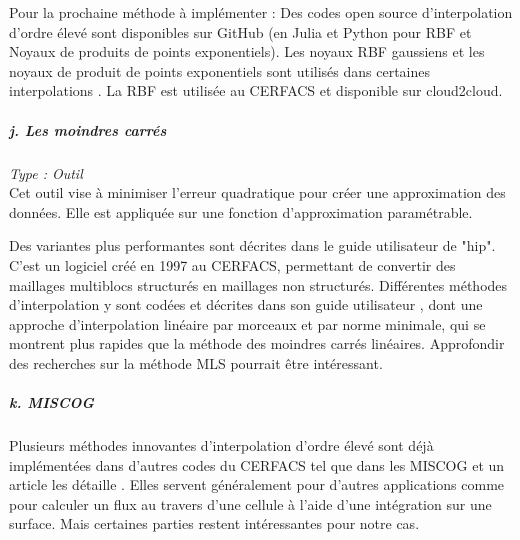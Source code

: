 Pour la prochaine méthode à implémenter : Des codes open source d'interpolation d'ordre élevé sont disponibles sur GitHub (en Julia \cite{opensource} et Python \cite{opensource_2} pour RBF et Noyaux de produits de points exponentiels)\cite{Rosenfeld}. Les noyaux RBF gaussiens et les noyaux de produit de points exponentiels sont utilisés dans certaines interpolations \cite{opensource_2}. La RBF est utilisée au CERFACS et disponible sur cloud2cloud. %

\subparagraph{j. Les moindres carrés} %
\textit{Type : Outil} \\ %
\phantom{----}
Cet outil vise à minimiser l'erreur quadratique pour créer une approximation des données. Elle est appliquée sur une fonction d'approximation paramétrable.

Des variantes plus performantes sont décrites dans le guide utilisateur de "hip".
C'est un logiciel créé en 1997 au CERFACS, permettant de convertir des maillages multiblocs structurés en maillages non structurés.
Différentes méthodes d'interpolation y sont codées et décrites dans son guide utilisateur \cite{muller2020}, dont une approche d'interpolation linéaire par morceaux et par norme minimale, qui se montrent plus rapides que la méthode des moindres carrés linéaires.
Approfondir des recherches sur la méthode \ac{MLS} \cite{levin, MLS} pourrait être intéressant.

\subparagraph{k. MISCOG}

\phantom{----}

Plusieurs méthodes innovantes d'interpolation d'ordre élevé sont déjà implémentées dans d'autres codes du CERFACS tel que dans les \ac{MISCOG} et un article les détaille \cite{laborderie2018}. Elles servent généralement pour d'autres applications comme pour calculer un flux au travers d'une cellule \cite{alexis} à l'aide d'une intégration sur une surface. Mais certaines parties restent intéressantes pour notre cas.


\newpage


